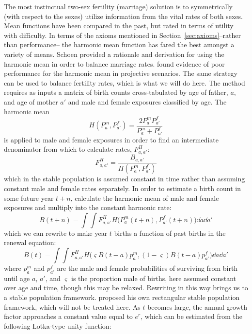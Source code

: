 The most instinctual two-sex fertility (marriage) solution is to symmetrically
(with respect to the sexes) utilize information from the vital rates of both
sexes. Mean functions have been compared in the past\citep[see
e.g.][]{keyfitz1972mathematics}, but rated in terms of utility with difficulty.
In terms of the axioms mentioned in Section~\ref{sec:axioms}--rather than
performance-- the harmonic mean function has fared the best amongst a variety of
means. Schoen \citep{schoen1978standardized, schoen1977two, schoen1981harmonic}
provided a rationale and derivation for using the harmonic mean in order to 
balance marriage rates. \citet{martcheva2001mathematics} found evidence of
poor performance for the harmonic mean in projective scenarios. The same
strategy can be used to balance fertility rates, which is what we will do here. The method requires as inputs a matrix of birth counts cross-tabulated by age of father, $a$, and age of mother $a'$ 
and male and female exposures classified by age. The harmonic mean
\begin{equation}
\label{eq:harmonic}
H(P_a^m, P_{a'}^f) = \frac{2 P_a^m P_{a'}^f}{P_a^m + P_{a'}^f}
\end{equation}
is applied to male and female exposures in order to find an intermediate
denominator from which to calculate rates, $F_{a,a'}^H$:
 \begin{equation}
 \label{eq:harmonicrate}
 F_{a,a'}^H = \frac{B_{a,a'}}{H(P_a^m, P_{a'}^f)}
 \end{equation}
which in the stable population is assumed constant in time rather than
assuming constant male and female rates separately. In order to estimate 
a birth count in some future year $t+n$, calculate the harmonic mean
of male and female exposures and multiply into the constant harmonic rate:
 \begin{equation}
 B(t+n) = \int \int F_{a,a'}^H H\Big(P_{a}^m(t+n), P_{a'}^f(t+n)\Big) \dd a \dd
 a'
 \end{equation}
which we can rewrite to make year $t$ births a function of past births in the
renewal equation:
 \begin{equation}
 B(t) = \int \int F_{a,a'}^H H\Big(\varsigma B(t-a)p_a^m, (1-\varsigma) B(t-a)
 p_{a'}^f\Big) \dd a
 \dd a'
 \end{equation}
where $p_a^m$ and $p_{a'}^f$ are the male and female probabilities of surviving
from birth until age $a$, $a'$, and $\varsigma$ is the proportion male of
births, here assumed constant over age and time, though this may be relaxed.
Rewriting in this way brings us to a stable population framework. \citet{schoen1977two} 
proposed his own rectangular stable population framework, which 
will not be treated here. As $t$ becomes large, the annual growth factor
approaches a constant value equal to $e^r$, which can be estimated from the
following Lotka-type unity function: 

